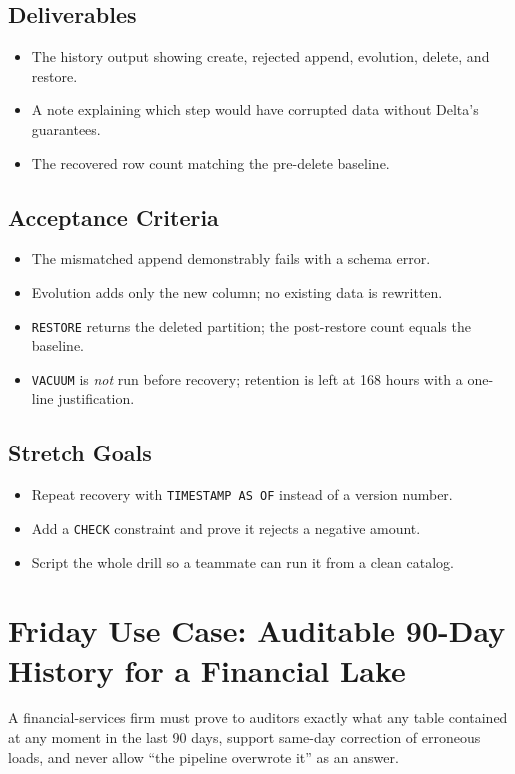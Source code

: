 \subsection*{Deliverables}
\begin{itemize}
    \item The history output showing create, rejected append, evolution, delete, and restore.
    \item A note explaining which step would have corrupted data without Delta's guarantees.
    \item The recovered row count matching the pre-delete baseline.
\end{itemize}

\subsection*{Acceptance Criteria}
\begin{itemize}
    \item The mismatched append demonstrably fails with a schema error.
    \item Evolution adds only the new column; no existing data is rewritten.
    \item \texttt{RESTORE} returns the deleted partition; the post-restore count equals the baseline.
    \item \texttt{VACUUM} is \emph{not} run before recovery; retention is left at 168 hours with a one-line justification.
\end{itemize}

\subsection*{Stretch Goals}
\begin{itemize}
    \item Repeat recovery with \texttt{TIMESTAMP AS OF} instead of a version number.
    \item Add a \texttt{CHECK} constraint and prove it rejects a negative amount.
    \item Script the whole drill so a teammate can run it from a clean catalog.
\end{itemize}

\section{Friday Use Case: Auditable 90-Day History for a Financial Lake}
A financial-services firm must prove to auditors exactly what any table contained at any moment in the last 90 days, support same-day correction of erroneous loads, and never allow ``the pipeline overwrote it'' as an answer.

